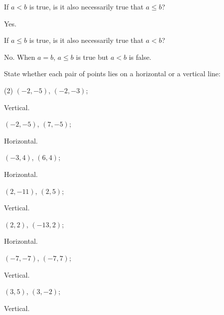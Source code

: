 \begin{questions}
  \item \begin{tasks}
    \task If $a<b$ is true, is it also necessarily true that $a \leq b$?

    \begin{solution}
      Yes.
    \end{solution}

    \task If $a \leq b$ is true, is it also necessarily true that $a<b$?

    \begin{solution}
      No. When $a=b$, $a \leq b$ is true but $a<b$ is false.
    \end{solution}

  \end{tasks}

  \item State whether each pair of points lies on a horizontal or a vertical line:
  \begin{tasks}(2)
    \task $(-2, -5)$, $(-2, -3)$;

    \begin{solution}
      Vertical.
    \end{solution}

    \task $(-2, -5)$, $(7, -5)$;

    \begin{solution}
      Horizontal.
    \end{solution}

    \task $(-3, 4)$, $(6, 4)$;

    \begin{solution}
      Horizontal.
    \end{solution}

    \task $(2, -11)$, $(2, 5)$;

    \begin{solution}
      Vertical.
    \end{solution}

    \task $(2, 2)$, $(-13, 2)$;

    \begin{solution}
      Horizontal.
    \end{solution}

    \task $(-7, -7)$, $(-7, 7)$;

    \begin{solution}
      Vertical.
    \end{solution}

    \task $(3, 5)$, $(3, -2)$;

    \begin{solution}
      Vertical.
    \end{solution}


\end{tasks}
\end{questions}
